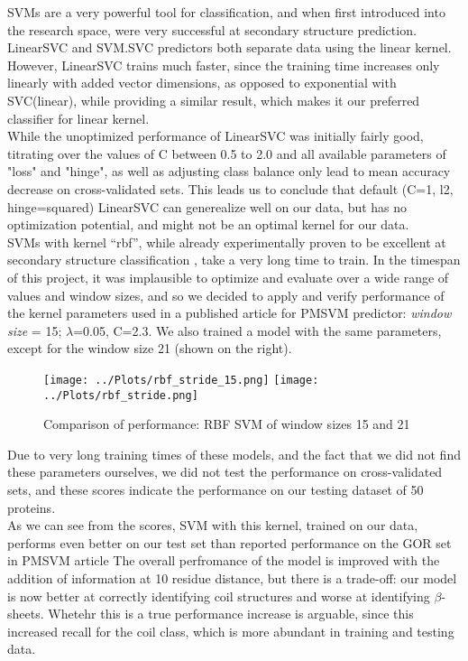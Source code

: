 \documentclass[12pt]{article}
\begin{document}
SVMs are a very powerful tool for classification, and when first introduced into the research space, were very successful at secondary structure prediction. 
LinearSVC and SVM.SVC predictors both separate data using the linear kernel. However, LinearSVC trains much faster, since the training time increases only linearly with added vector dimensions, as opposed to exponential with SVC(linear), while providing a similar result, which makes it our preferred classifier for linear kernel.\\
While the unoptimized performance of LinearSVC was initially fairly good, titrating over the values of C between 0.5 to 2.0 and all available parameters of "loss" and "hinge", as well as adjusting class balance only lead to mean accuracy decrease on cross-validated sets. This leads us to conclude that default (C=1, l2, hinge=squared) LinearSVC can generealize well on our data, but has no optimization potential, and might not be an optimal kernel for our data.\\
SVMs with kernel “rbf”, while already experimentally proven to be excellent at secondary structure classification\cite{1} \cite{3}, take a very long time to train. In the timespan of this project, it was implausible to optimize and evaluate over a wide range of values and window sizes, and so we decided to apply and verify performance of the kernel parameters used in a published article for PMSVM predictor: \emph{window size} = 15; $\lambda$=0.05, C=2.3. We also trained a model with the same parameters, except for the window size 21 (shown on the right). \\
\begin{figure}[H]
\hspace*{-0.75in}
\texttt{[image: ../Plots/rbf\_stride\_15.png]} 
\hspace*{-0.8in}
\texttt{[image: ../Plots/rbf\_stride.png]} 
\caption{Comparison of performance: RBF SVM of window sizes 15 and 21}
\end{figure}
\noindent Due to very long training times of these models, and the fact that we did not find these parameters ourselves, we did not test the performance on cross-validated sets, and these scores indicate the performance on our testing dataset of 50 proteins.\\[0.1cm]
As we can see from the scores, SVM with this kernel, trained on our data, performs even better on our test set than reported performance on the GOR set in PMSVM article\cite{1}
\noindent The overall perfromance of the model is improved with the addition of information at 10 residue distance, but there is a trade-off: our model is now better at correctly identifying coil structures and worse at identifying $ \beta $-sheets. Whetehr this is a true performance increase is arguable, since this  increased recall for the coil class, which is more abundant in training and testing data. 
\end{document}
